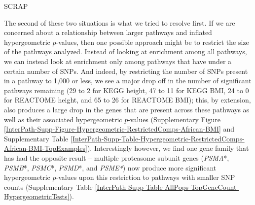 \documentclass[12pt,a4paper]{article}
\begin{document}
\nolinenumbers

\begingroup


\endgroup














\iffalse

SCRAP




The second of these two situations is what we tried to resolve first. If we are concerned about a relationship between larger pathways and inflated hypergeometric $p$-values, then one possible approach might be to restrict the size of the pathways analyzed. Instead of looking at enrichment among all pathways, we can instead look at enrichment only among pathways that have under a certain number of SNPs. And indeed, by restricting the number of SNPs present in a pathway to 1,000 or less, we see a major drop off in the number of significant pathways remaining (29 to 2 for KEGG height, 47 to 11 for KEGG BMI, 24 to 0 for REACTOME height, and 65 to 26 for REACTOME BMI); this, by extension, also produces a large drop in the genes that are present across these pathways as well as their associated hypergeometric $p$-values (Supplementary Figure \ref{InterPath-Supp-Figure-Hypergeometric-RestrictedComps-African-BMI} and Supplementary Table \ref{InterPath-Supp-Table-Hypergeometric-RestrictedComps-African-BMI-TopExamples}). Interestingly however, we find one gene family that has had the opposite result -- multiple proteasome subunit genes (\textit{PSMA}*, \textit{PSMB}*, \textit{PSMC}*, \textit{PSMD}*, and \textit{PSME*}) now produce more significant hypergeometric $p$-values upon this restriction to pathways with smaller SNP counts (Supplementary Table \ref{InterPath-Supp-Table-AllPops-TopGeneCount-HypergeometricTests}). 
\end{document}
